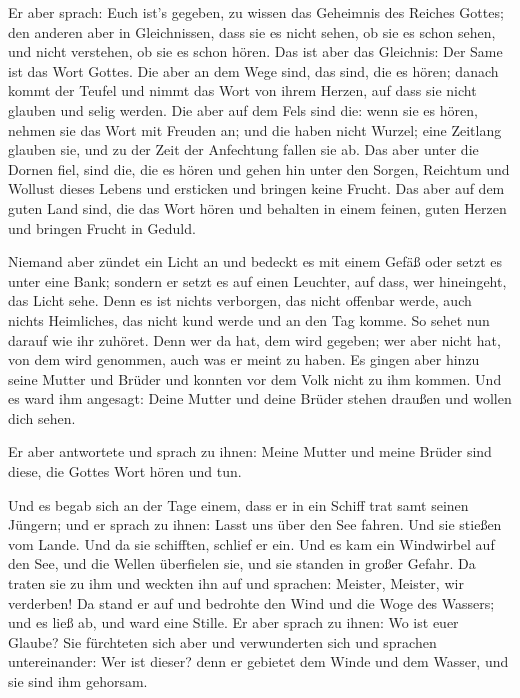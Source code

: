  Er aber sprach: Euch ist's gegeben, zu wissen das
Geheimnis des Reiches Gottes; den anderen aber in Gleichnissen, dass sie
es nicht sehen, ob sie es schon sehen, und nicht verstehen, ob sie es
schon hören.  Das ist aber das Gleichnis: Der Same ist
das Wort Gottes.  Die aber an dem Wege sind, das sind,
die es hören; danach kommt der Teufel und nimmt das Wort von ihrem
Herzen, auf dass sie nicht glauben und selig werden.  Die
aber auf dem Fels sind die: wenn sie es hören, nehmen sie das Wort mit
Freuden an; und die haben nicht Wurzel; eine Zeitlang glauben sie, und
zu der Zeit der Anfechtung fallen sie ab.  Das aber unter
die Dornen fiel, sind die, die es hören und gehen hin unter den Sorgen,
Reichtum und Wollust dieses Lebens und ersticken und bringen keine
Frucht.  Das aber auf dem guten Land sind, die das Wort
hören und behalten in einem feinen, guten Herzen und bringen Frucht in
Geduld.

 Niemand aber zündet ein Licht an und bedeckt es mit
einem Gefäß oder setzt es unter eine Bank; sondern er setzt es auf einen
Leuchter, auf dass, wer hineingeht, das Licht sehe.  Denn
es ist nichts verborgen, das nicht offenbar werde, auch nichts
Heimliches, das nicht kund werde und an den Tag komme. 
So sehet nun darauf wie ihr zuhöret. Denn wer da hat, dem wird gegeben;
wer aber nicht hat, von dem wird genommen, auch was er meint zu haben.
 Es gingen aber hinzu seine Mutter und Brüder und konnten
vor dem Volk nicht zu ihm kommen.  Und es ward ihm
angesagt: Deine Mutter und deine Brüder stehen draußen und wollen dich
sehen.

 Er aber antwortete und sprach zu ihnen: Meine Mutter und
meine Brüder sind diese, die Gottes Wort hören und tun.

 Und es begab sich an der Tage einem, dass er in ein
Schiff trat samt seinen Jüngern; und er sprach zu ihnen: Lasst uns über
den See fahren. Und sie stießen vom Lande.  Und da sie
schifften, schlief er ein. Und es kam ein Windwirbel auf den See, und
die Wellen überfielen sie, und sie standen in großer Gefahr.
 Da traten sie zu ihm und weckten ihn auf und sprachen:
Meister, Meister, wir verderben! Da stand er auf und bedrohte den Wind
und die Woge des Wassers; und es ließ ab, und ward eine Stille.
 Er aber sprach zu ihnen: Wo ist euer Glaube? Sie
fürchteten sich aber und verwunderten sich und sprachen untereinander:
Wer ist dieser? denn er gebietet dem Winde und dem Wasser, und sie sind
ihm gehorsam.

